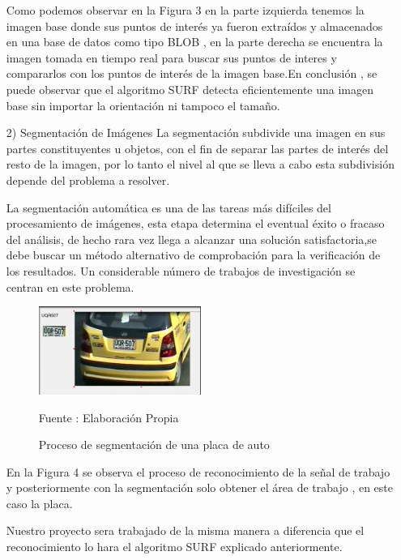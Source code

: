 \documentclass[a4paper, 12pt]{article}
\begin{document}
\begin{enumerate}
Como podemos observar en la Figura 3 en la parte izquierda tenemos la imagen base donde sus puntos de interés ya fueron extraídos y almacenados en una base de datos como tipo BLOB  , en la parte derecha se encuentra la imagen tomada en tiempo real para buscar sus puntos de interes y compararlos con los puntos de interés de la imagen base.En conclusión , se puede observar que el algoritmo SURF detecta eficientemente una imagen base sin importar la orientación ni tampoco el tamaño.

\vskip 0.3cm

\item[2)] Segmentación de Imágenes
\vskip 0.3cm
La segmentación subdivide una imagen en sus partes constituyentes u objetos, con el fin de separar las partes de interés del resto de la imagen, por lo tanto el nivel al que se lleva a cabo esta subdivisión depende del problema a resolver. \citep{palomino2009tecnicas} \par
La segmentación automática es una de las tareas más difíciles del procesamiento de imágenes, esta etapa determina el eventual éxito o fracaso del análisis, de hecho rara vez llega a alcanzar una solución satisfactoria,se debe buscar un método alternativo de comprobación para la verificación de los resultados. Un considerable número de trabajos de investigación se centran en este problema.\citep{palomino2009tecnicas} \par

\begin{figure}[ht]
\begin{center}
\includegraphics[width=0.5\textwidth]{segmentacion}
\end{center}
\begin{center}
\caption{\small{Proceso de segmentación de una placa de auto}}
{\small{Fuente : Elaboración Propia}}
\end{center}
\end{figure}
\vskip 0.3cm

En la Figura 4 se observa el proceso de reconocimiento de la señal de trabajo y posteriormente con la segmentación solo obtener el área de trabajo , en este caso la placa.\par
Nuestro proyecto sera trabajado de la misma manera a diferencia que el reconocimiento lo hara el algoritmo SURF explicado anteriormente.


\end{enumerate}
\end{document}
